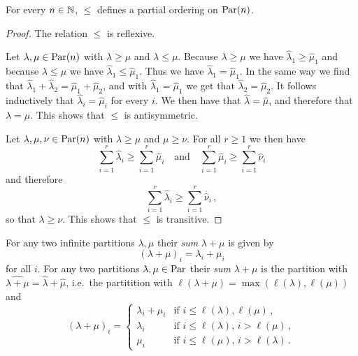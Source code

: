 \begin{lemma}
  For every $n \in \mathbb{N}$, $\leq$ defines a partial ordering on $\operatorname{Par}(n)$.
\end{lemma}
\begin{proof}
  The relation $\leq$ is reflexive.
  
  Let $\lambda, \mu \in \operatorname{Par}(n)$ with $\lambda \geq \mu$ and $\lambda \leq \mu$.
  Because $\lambda \geq \mu$ we have $\hat{\lambda}_1 \geq \hat{\mu}_1$ and because $\lambda \leq \mu$ we have $\hat{\lambda}_1 \leq \hat{\mu}_1$.
  Thus we have $\hat{\lambda}_1 = \hat{\mu}_1$.
  In the same way we find that $\hat{\lambda}_1 + \hat{\lambda}_2 = \hat{\mu}_1 + \hat{\mu}_2$, and with $\hat{\lambda}_1 = \hat{\mu}_1$ we get that $\hat{\lambda}_2 = \hat{\mu}_2$.
  It follows inductively that $\hat{\lambda}_i = \hat{\mu}_i$ for every $i$.
  We then have that $\hat{\lambda} = \hat{\mu}$, and therefore that $\lambda = \mu$.
  This shows that $\leq$ is antisymmetric.
  
  Let $\lambda, \mu, \nu \in \operatorname{Par}(n)$ with $\lambda \geq \mu$ and $\mu \geq \nu$.
  For all $r \geq 1$ we then have
  \[
          \sum_{i=1}^r \hat{\lambda}_i
    \geq  \sum_{i=1}^r \hat{\mu}_i
    \quad\text{and}\quad
          \sum_{i=1}^r \hat{\mu}_i
    \geq  \sum_{i=1}^r \hat{\nu}_i
  \]
  and therefore
  \[
          \sum_{i=1}^r \hat{\lambda}_i
    \geq  \sum_{i=1}^r \hat{\nu}_i \,,
  \]
  so that $\lambda \geq \nu$.
  This shows that $\leq$ is transitive.
\end{proof}

\begin{definition}
  For any two infinite partitions $\lambda, \mu$ their \emph{sum} $\lambda + \mu$ is given by
  \[
      (\lambda + \mu)_i
    = \lambda_i + \mu_i
  \]
  for all $i$.
  For any two partitions $\lambda, \mu \in \operatorname{Par}$ their \emph{sum} $\lambda + \mu$ is the partition with $\widehat{\lambda + \mu} = \hat{\lambda} + \hat{\mu}$, i.e.\ the partitition with $\ell(\lambda + \mu) = \max( \ell(\lambda), \ell(\mu) )$ and
  \[
      (\lambda+\mu)_i
    = \begin{cases}
        \lambda_i + \mu_i & \text{if $i \leq \ell(\lambda), \ell(\mu)$}       \,, \\
        \lambda_i         & \text{if $i \leq \ell(\lambda)$, $i > \ell(\mu)$} \,, \\
        \mu_i             & \text{if $i \leq \ell(\mu)$, $i > \ell(\lambda)$} \,.
      \end{cases}
  \]
\end{definition}


